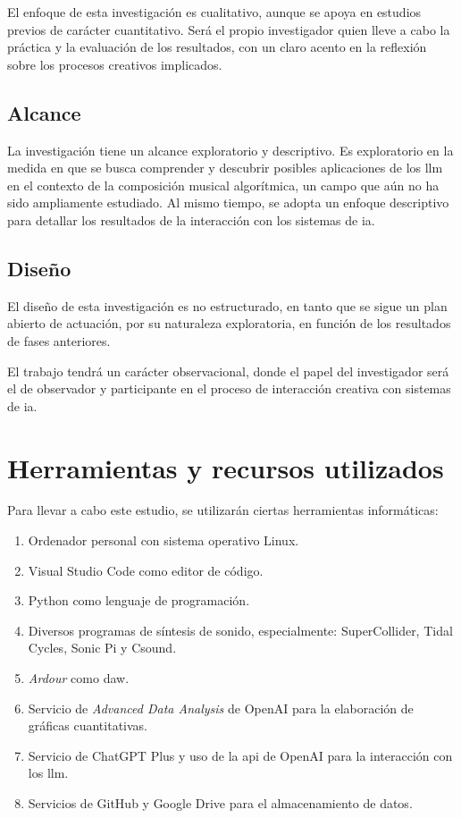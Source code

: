 El enfoque de esta investigación es {cualitativo}, aunque se apoya en estudios previos de carácter cuantitativo. Será el propio investigador quien lleve a cabo la práctica y la evaluación de los resultados, con un claro acento en la reflexión sobre los procesos creativos implicados.

\subsection{Alcance}
La investigación tiene un alcance {exploratorio} y {descriptivo}. Es exploratorio en la medida en que se busca comprender y descubrir posibles aplicaciones de los \gls{llm} en el contexto de la composición musical algorítmica, un campo que aún no ha sido ampliamente estudiado. Al mismo tiempo, se adopta un enfoque descriptivo para detallar los resultados de la interacción con los sistemas de \gls{ia}.


\subsection{Diseño}
El diseño de esta investigación es {no estructurado}, en tanto que se sigue un plan abierto de actuación, por su naturaleza exploratoria, en función de los resultados de fases anteriores.

El trabajo tendrá un carácter {observacional}, donde el papel del investigador será el de observador y participante en el proceso de interacción creativa con sistemas de \gls{ia}.

\section{Herramientas y recursos utilizados}

Para llevar a cabo este estudio, se utilizarán ciertas herramientas informáticas:

\begin{enumerate}
    \item Ordenador personal con sistema operativo Linux.
    \item Visual Studio Code como editor de código.
    \item Python como lenguaje de programación.
    \item Diversos programas de síntesis de sonido, especialmente: SuperCollider, Tidal Cycles, Sonic Pi y Csound.
    \item \emph{Ardour} como \gls{daw}.
    \item Servicio de \emph{Advanced Data Analysis} de OpenAI para la elaboración de gráficas cuantitativas.
    \item Servicio de ChatGPT Plus y uso de la \gls{api} de OpenAI para la interacción con los \gls{llm}.
    \item Servicios de GitHub y Google Drive para el almacenamiento de datos.
\end{enumerate}


